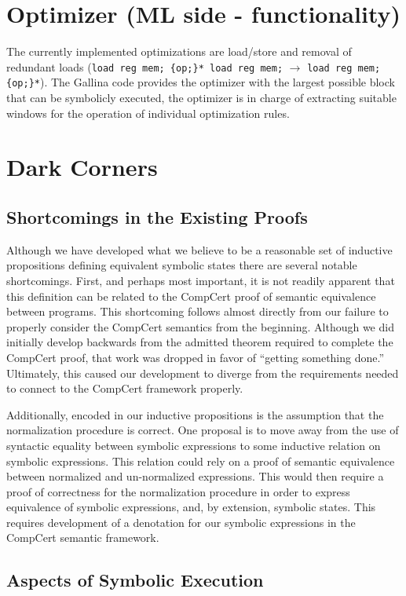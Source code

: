 \documentclass{article}
\begin{document}
\section{Optimizer (ML side - functionality)}
The currently implemented optimizations are load/store and removal of
redundant loads ({\tt load reg mem; \{op;\}* load reg mem;}
$\rightarrow$ {\tt load reg mem; \{op;\}*}).  The Gallina code
provides the optimizer with the largest possible block that can be
symbolicly executed, the optimizer is in charge of extracting suitable
windows for the operation of individual optimization rules.

\section{Dark Corners}

\subsection{Shortcomings in the Existing Proofs}
Although we have developed what we believe to be a reasonable set of
inductive propositions defining equivalent symbolic states there are
several notable shortcomings. First, and perhaps most important, it is
not readily apparent that this definition can be related to the
CompCert proof of semantic equivalence between programs. This
shortcoming follows almost directly from our failure to properly
consider the CompCert semantics from the beginning. Although we did
initially develop backwards from the admitted theorem required to
complete the CompCert proof, that work was dropped in favor of
``getting something done.'' Ultimately, this caused our development to
diverge from the requirements needed to connect to the CompCert
framework properly.

Additionally, encoded in our inductive propositions is the assumption
that the normalization procedure is correct. One proposal is to move
away from the use of syntactic equality between symbolic expressions to
some inductive relation on symbolic expressions. This relation could
rely on a proof of semantic equivalence between normalized and
un-normalized  expressions. This would then require a proof of
correctness for the normalization procedure in order to express
equivalence of symbolic expressions, and, by extension, symbolic
states. This requires development of a denotation for our symbolic
expressions in the CompCert semantic framework.


\subsection{Aspects of Symbolic Execution}
\end{document}

